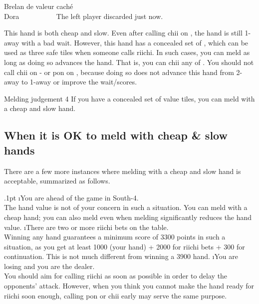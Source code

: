 \begin{itembox}[r]{Brelan de valeur caché}
\bp
{}\zhong\zhong\zhong~~\xi\\
\hfill\footnotesize{{\jap Dora}~~~~~~~~~~}
\ep
\vspace{-20pt}The left player discarded {\LARGE{}} just now.
\end{itembox}

\noindent
This hand is both cheap and slow. Even after calling {\jap chii} on {\LARGE{}}, the hand is still 1-away with a bad wait. However, this hand has a concealed set of {\LARGE\zhong}, which can be used as three safe tiles when someone calls riichi. In such cases, you can meld as long as doing so advances the hand. That is, you can {\jap chii} any of {\LARGE{}}. You should not call {\jap chii} on {\LARGE{}-} or {\jap pon} on {\LARGE{}}, because doing so does not advance this hand from 2-away to 1-away or improve the wait/scores. 

\bigskip
\color{MyRed}
\begin{itembox}[c]{Melding judgement 4}\normalcolor
If you have a concealed set of value tiles, you can meld with a cheap and slow hand.
\end{itembox}\normalcolor

\subsection{When it is OK to meld with cheap \& slow hands}
There are a few more instances where melding with a cheap and slow hand is acceptable, summarized as follows. 

\be\itemsep.1pt
\i You are ahead of the game in South-4.\\
The hand value is not of your concern in such a situation. You can meld with a cheap hand; you can also meld even when melding significantly reduces the hand value.
\i There are two or more riichi bets on the table.\\
Winning any hand guarantees a minimum score of 3300 points in such a situation, as you get at least 1000 (your hand) + 2000 for riichi bets + 300 for continuation. This is not much different from winning a 3900 hand.
\i You are losing and you are the dealer.\\
You should aim for calling riichi as soon as possible in order to delay the opponents' attack. However, when you think you cannot make the hand ready for riichi soon enough, calling {\jap pon} or {\jap chii} early may serve the same purpose. 
\ee

